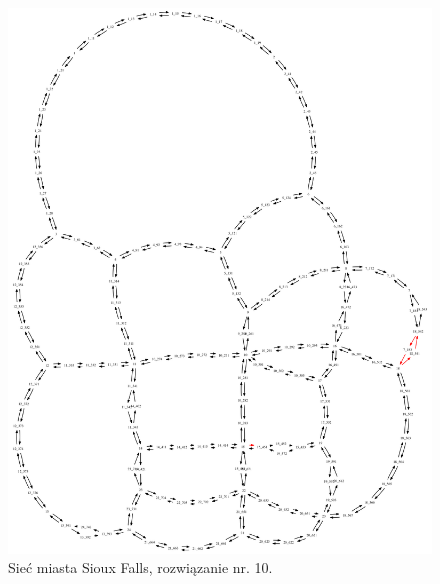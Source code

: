 \documentclass[twoside,12pt]{report}
\begin{document}
\begin{figure}[ht]
\centering
\includegraphics[totalheight=0.580\textheight, angle=90]{img/sioux-out/10/network2}
\caption{Sieć miasta Sioux Falls, rozwiązanie nr. 10.}
\label{sioux10}
\end{figure}
\end{document}
